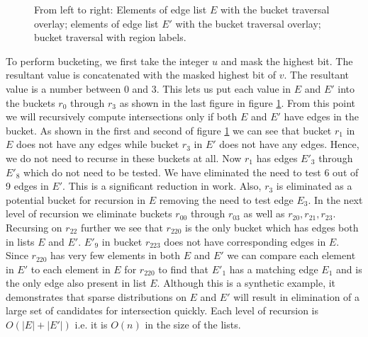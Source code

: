 \begin{figure}
\caption{\label{fig_radix_bucketing}From left to right: Elements of edge list $E$ with the bucket traversal overlay; elements of edge list $E'$ with the bucket traversal overlay; bucket traversal with region labels.}
\end{figure}

To perform bucketing, we first take the integer $u$ and mask the highest bit. The resultant value is concatenated with the masked highest bit of $v$. The resultant value is a number between 0 and 3. This lets us put each value in $E$ and $E'$ into the buckets $r_0$ through $r_3$ as shown in the last figure in figure \ref{fig_radix_bucketing}. From this point we will recursively compute intersections only if both $E$ and $E'$ have edges in the bucket. As shown in the first and second of figure \ref{fig_radix_bucketing} we can see that bucket $r_1$ in $E$ does not have any edges while bucket $r_3$ in $E'$ does not have any edges. Hence, we do not need to recurse in these buckets at all. Now $r_1$ has edges $E'_3$ through $E'_8$ which do not need to be tested. We have eliminated the need to test 6 out of 9 edges in $E'$. This is a significant reduction in work. Also, $r_3$ is eliminated as a potential bucket for recursion in $E$ removing the need to test edge $E_3$. In the next level of recursion we eliminate buckets $r_{00}$ through $r_{03}$ as well as $r_{20}, r_{21}, r_{23}$. Recursing on $r_{22}$ further we see that $r_{220}$ is the only bucket which has edges both in lists $E$ and $E'$. $E'_9$ in bucket $r_{223}$ does not have corresponding edges in $E$. Since $r_{220}$ has very few elements in both $E$ and $E'$ we can compare each element in $E'$ to each element in $E$ for $r_{220}$ to find that $E'_1$ has a matching edge $E_1$ and is the only edge also present in list $E$.
Although this is a synthetic example, it demonstrates that sparse distributions on $E$ and $E'$ will result in elimination of a large set of candidates for intersection quickly. Each level of recursion is $O(|E|+|E'|)$ i.e. it is $O(n)$ in the size of the lists.


